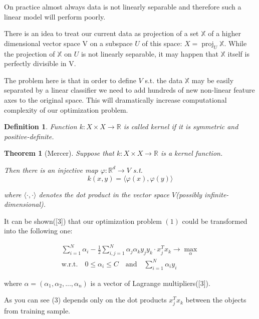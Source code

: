 \documentclass{article}
\DeclareMathOperator{\proj}{proj}
\theoremstyle{bfnote}
\newtheorem{defi}{Definition}
\newtheorem{thm}{Theorem}
\begin{document}
	On practice almost always data is not linearly separable and therefore such a linear model will perform poorly.
	
	There is an idea to treat our current data as projection of a set $\mathbb{X}$ of a higher dimensional vector space V on a subspace $U$ of this space: $X=\proj_U \mathbb{X}$. While the projection of $\mathbb{X}$ on $U$ is not linearly separable, it may happen that $\mathbb{X}$ itself is perfectly divisible in V.
	
	The problem here is that in order to define $V$ s.t. the data $\mathbb{X}$ may be easily separated by a linear classifier
	we need to add hundreds of new non-linear feature axes to the original space. This will dramatically increase computational complexity of our optimization problem.
	
	\begin{defi}
	Function $k: X \times X \rightarrow \mathbb{R}$ is called kernel if it is symmetric and positive-definite.
	\end{defi}
	
	\begin{thm}[Mercer]
		
		Suppose that $k: X \times X \rightarrow \mathbb{R}$ is a kernel function.

		Then there is an injective map $\varphi: \mathbb{R}^d \rightarrow V$ s.t. 
		$$k(x, y) = \langle \varphi(x), \varphi(y) \rangle$$ 
		
		where $\langle \cdot , \cdot \rangle$ denotes the dot product in the vector space $V$(possibly infinite-dimensional).
		
	\end{thm}	

	
	It can be shown([3]) that our optimization problem $(1)$ could be transformed into the following one:
	
	\begin{gather}
	\sum_{i=1}^N {\alpha_i} - \frac{1}{2}\sum_{i,j=1}^N \alpha_j \alpha_k y_j y_k \cdot x_j^T x_k
	\rightarrow \max\limits_{\alpha} \\
	\text{w.r.t.} \quad 0 \le \alpha_i \le C \quad \text{and} \quad \sum_{i=1}^N \alpha_i y_i
	\end{gather}
	
	where $\alpha=(\alpha_1, \alpha_2, ..., \alpha_n)$ is a vector of Lagrange multipliers([3]).
	
	
	As you can see (3) depends only on the dot products $x_j^T x_k$ between the objects from training sample.
\end{document}
